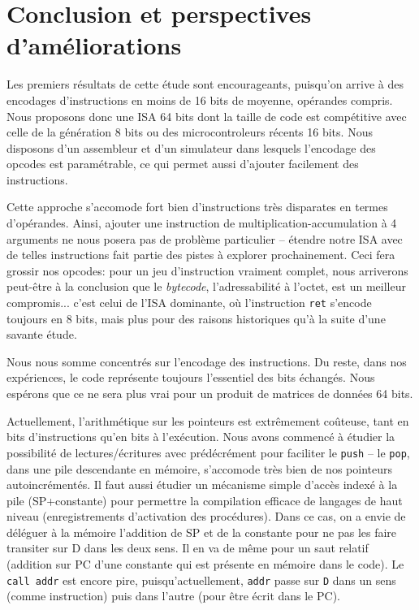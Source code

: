 \documentclass[architecture]{compas2018}
\begin{document}
\section{Conclusion et perspectives d'améliorations}

Les premiers résultats de cette étude sont encourageants, puisqu'on arrive à des encodages d'instructions en moins de 16 bits de moyenne, opérandes compris.
Nous proposons donc une ISA 64 bits dont la taille de code est compétitive avec celle de la génération 8 bits ou des microcontroleurs récents 16 bits.
Nous disposons d'un assembleur et d'un simulateur dans lesquels l'encodage des opcodes est paramétrable, ce qui permet aussi d'ajouter facilement des instructions.



Cette approche s'accomode fort bien d'instructions très disparates en termes d'opérandes.
Ainsi, ajouter une instruction de multiplication-accumulation à 4 arguments ne nous posera pas de problème particulier -- étendre notre ISA avec de telles instructions fait partie des pistes à explorer prochainement.
Ceci fera grossir nos opcodes: pour un jeu d'instruction vraiment complet, nous arriverons peut-être à la conclusion que le \emph{bytecode}, l'adressabilité à l'octet, est un meilleur compromis... c'est celui de l'ISA dominante, où l'instruction \texttt{ret} s'encode toujours en 8 bits, mais plus pour des raisons historiques qu'à la suite d'une savante étude.

Nous nous somme concentrés sur l'encodage des instructions.
Du reste, dans nos expériences, le code représente toujours l'essentiel des bits échangés.
Nous espérons que ce ne sera plus vrai pour un produit de matrices de données 64 bits.

Actuellement, l'arithmétique sur les pointeurs est extrêmement coûteuse, tant en bits d'instructions qu'en bits à l'exécution.
Nous avons commencé à étudier la possibilité de lectures/écritures avec prédécrément pour faciliter le \texttt{push} -- le \texttt{pop}, dans une pile descendante en mémoire, s'accomode très bien de nos pointeurs autoincrémentés.
Il faut aussi étudier un mécanisme simple  d'accès indexé à la pile (SP+constante) pour permettre la compilation efficace de langages de haut niveau (enregistrements d'activation des procédures).
Dans ce cas, on a envie de déléguer à la mémoire l'addition de SP et de la constante pour ne pas les faire transiter sur D dans les deux sens.
Il en va de même pour un saut relatif (addition sur PC d'une constante qui est présente en mémoire dans le code).
Le  \texttt{call addr} est encore pire, puisqu'actuellement, \texttt{addr} passe sur \texttt{D} dans un sens (comme instruction) puis dans l'autre (pour être écrit dans le PC).
\end{document}
